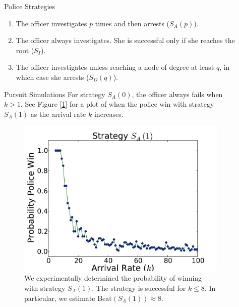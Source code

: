 \documentclass[final]{beamer}
\newlength{\sepwid}
\newlength{\onecolwid}
\begin{document}
\begin{frame}[t]
\begin{columns}[t]
\begin{column}{\onecolwid}
 \begin{block}{Police Strategies}
 \begin{enumerate}
 \item The officer investigates $p$ times and then arrests ($S_{A}(p)$).
  \item The officer always investigates.  She is successful only if she reaches the root ($S_{I}$).
\item The officer investigates unless reaching a node of degree at least $q$, in which case she arrests ($S_{D}(q)$).
 \end{enumerate}
 \end{block}
 
 \begin{block}{Pursuit Simulations}
 For strategy $S_A(0)$, the officer always fails when $k > 1$.  See Figure [\ref{SA(1)}] for a plot of when the police win with strategy $S_A(1)$ as the arrival rate $k$ increases.
  \begin{figure}
 \includegraphics[width=.6\linewidth]{ImprovedPlotS0.pdf}
 \caption{We experimentally determined the probability of winning with strategy $S_A(1)$.  The strategy is successful for $k \leq 8$.  In particular, we estimate Beat$(S_A(1)) \approx 8$.}
 \label{SA(1)}
 \end{figure}
\end{block}

 \end{column}



\begin{column}{\sepwid}\end{column}			%


\begin{column}{\onecolwid}					  


\end{column}
\end{columns}
\end{frame}
\end{document}
